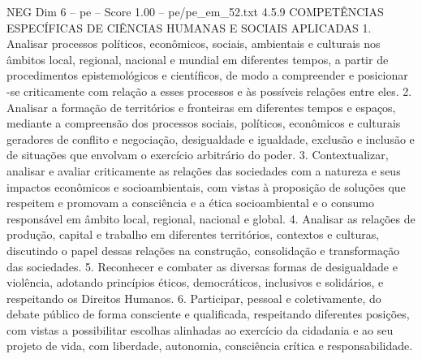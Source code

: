 \begin{textsample}{NEG Dim 6 – pe – Score 1.00 – pe/pe\_em\_52.txt}  \label{ex:f6_neg_035}
4.5.9 COMPETÊNCIAS ESPECÍFICAS DE CIÊNCIAS HUMANAS E SOCIAIS APLICADAS 1.
Analisar processos políticos, econômicos, sociais, ambientais e culturais nos âmbitos local, regional, nacional e mundial em diferentes tempos, a partir de procedimentos epistemológicos e científicos, de modo a compreender e posicionar -se criticamente com relação a esses processos e às possíveis relações entre eles. 2.
Analisar a formação de territórios e fronteiras em diferentes tempos e espaços, mediante a compreensão dos processos sociais, políticos, econômicos e culturais geradores de conflito e negociação, desigualdade e igualdade, exclusão e inclusão e de situações que envolvam o exercício arbitrário do poder. 3.
Contextualizar, analisar e avaliar criticamente as relações das sociedades com a natureza e seus impactos econômicos e socioambientais, com vistas à proposição de soluções que respeitem e promovam a consciência e a ética socioambiental e o consumo responsável em âmbito local, regional, nacional e global. 4.
Analisar as relações de produção, capital e trabalho em diferentes territórios, contextos e culturas, discutindo o papel dessas relações na construção, consolidação e transformação das sociedades. 5.
Reconhecer e combater as diversas formas de desigualdade e violência, adotando princípios éticos, democráticos, inclusivos e solidários, e respeitando os Direitos Humanos. 6.
Participar, pessoal e coletivamente, do debate público de forma consciente e qualificada, respeitando diferentes posições, com vistas a possibilitar escolhas alinhadas ao exercício da cidadania e ao seu projeto de vida, com liberdade, autonomia, consciência crítica e responsabilidade.

\end{textsample}

